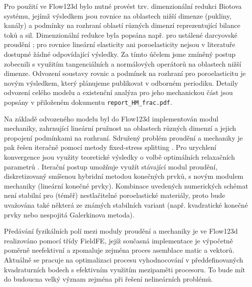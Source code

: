 \documentclass[11pt,a4paper]{article}
\begin{document}
\begin{onehalfspacing}
Pro použití ve Flow123d bylo nutné provést tzv. dimenzionální redukci Biotova systému, jejímž výsledkem jsou rovnice na oblastech nižší dimenze (pukliny, kanály) a podmínky na rozhraní oblastí různých dimenzí reprezentující bilance toků a sil. Dimenzionální redukce byla popsána např. pro ustálené darcyovské proudění \cite{martin_modeling_2005}; pro rovnice lineární elasticity ani poroelasticity nejsou v literatuře dostupné žádné odpovídající výsledky. Za tímto účelem jsme zmíněný postup zobecnili s využitím tangenciálních a normálových operátorů na oblastech nižší dimenze. Odvození soustavy rovnic a podmínek na rozhraní pro poroelasticitu je novým výsledkem, který plánujeme publikovat v odborném periodiku. Detaily odvození celého modelu a existenční analýza pro jeho mechanickou část jsou popsány v přiloženém dokumentu \texttt{report\_HM\_frac.pdf}.
 
Na základě odvozeného modelu byl do Flow123d implementován modul mechaniky, zahrnující lineární pružnost na oblastech různých dimenzí a jejich propojení podmínkami na rozhraní. Sdružený problém proudění a mechaniky je pak řešen iteračně pomocí metody fixed-stress splitting \cite{mikelic_wheeler}. Pro urychlení konvergence jsou využity teoretické výsledky o volbě optimálních relaxačních parametrů \cite{both_fixed_stress_split}. Iterační postup umožňuje využít stávající modul proudění, diskretizovaný smíšenou hybridní metodou konečných prvků, s novým modulem mechaniky (lineární konečné prvky). Kombinace uvedených numerických schémat není stabilní pro (téměř) nestlačitelné poroelastické materiály, proto bude uvažována také některá ze známých stabilních variant (např. kvadratické konečné prvky nebo nespojitá Galerkinova metoda).

Předávání fyzikálních polí mezi moduly proudění a mechaniky je ve Flow123d realizováno pomocí třídy FieldFE, jejíž současná implementace je výpočetně poměrně neefektivní a zpomaluje zejména proces asemblace matic a vektorů. Aktuálně se pracuje na optimalizaci procesu vyhodnocování v předdefinovaných kvadraturních bodech s efektivním využitím mezipaměti procesoru. To bude mít do budoucna velký význam zejména při řešení nelineárních problémů.


\end{onehalfspacing}
\end{document}
